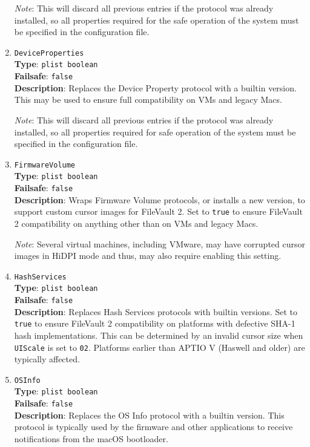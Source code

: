 \documentclass[]{article}
\begin{document}
\begin{enumerate}
  \emph{Note}: This will discard all previous entries if the protocol was already
  installed, so all properties required for the safe operation of the system must
  be specified in the configuration file.

\item
  \texttt{DeviceProperties}\\
  \textbf{Type}: \texttt{plist\ boolean}\\
  \textbf{Failsafe}: \texttt{false}\\
  \textbf{Description}: Replaces the Device Property protocol with a builtin
  version. This may be used to ensure full compatibility on VMs and legacy Macs.

  \emph{Note}: This will discard all previous entries if the protocol was already
  installed, so all properties required for safe operation of the system must be
  specified in the configuration file.

\item
  \texttt{FirmwareVolume}\\
  \textbf{Type}: \texttt{plist\ boolean}\\
  \textbf{Failsafe}: \texttt{false}\\
  \textbf{Description}: Wraps Firmware Volume protocols, or installs a new version,
  to support custom cursor images for FileVault 2. Set to \texttt{true} to ensure
  FileVault 2 compatibility on anything other than on VMs and legacy Macs.

  \emph{Note}: Several virtual machines, including VMware, may have corrupted
  cursor images in HiDPI mode and thus, may also require enabling this setting.

\item
  \texttt{HashServices}\\
  \textbf{Type}: \texttt{plist\ boolean}\\
  \textbf{Failsafe}: \texttt{false}\\
  \textbf{Description}: Replaces Hash Services protocols with builtin versions.
  Set to \texttt{true} to ensure FileVault 2 compatibility on platforms with
  defective SHA-1 hash implementations. This can be determined by an invalid
  cursor size when \texttt{UIScale} is set to \texttt{02}. Platforms earlier
  than APTIO V (Haswell and older) are typically affected.

\item
  \texttt{OSInfo}\\
  \textbf{Type}: \texttt{plist\ boolean}\\
  \textbf{Failsafe}: \texttt{false}\\
  \textbf{Description}: Replaces the OS Info protocol with a builtin
  version. This protocol is typically used by the firmware and other
  applications to receive notifications from the macOS bootloader.


\end{enumerate}
\end{document}
